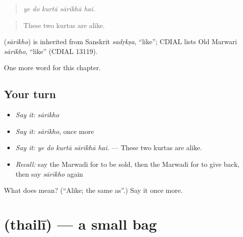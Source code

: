 \begin{quote}
    
\end{quote}

\begin{quote}
\emph{ye do kurtā sārīkhā hai.}
\end{quote}

\begin{quote}
These two kurtas are alike.
\end{quote}

\begin{cousinweb}
\textbf{} (\emph{sārīkho}) is inherited from Sanskrit \emph{sadṛkṣa}, \textquotedblleft{}like\textquotedblright{}; CDIAL lists Old Marwari \emph{sārikho}, \textquotedblleft{}like\textquotedblright{} (CDIAL 13119).
\end{cousinweb}

\begin{grammarlens}[title={What you've built}]
One more word for this chapter.
\end{grammarlens}

\subsection*{Your turn}
\begin{itemize}
\raggedright
  \item \emph{Say it:} \emph{sārīkho}
  \item \emph{Say it:} \emph{sārīkho}, once more
  \item \emph{Say it:} \emph{ye do kurtā sārīkhā hai.} — These two kurtas are alike.
  \item \emph{Recall:} say the Marwadi for to be sold, then the Marwadi for to give back, then say \emph{sārīkho} again
\end{itemize}

\begin{tcolorbox}[breakable,colback=teal!4,colframe=teal!35!black,title={Before you move on}]
What does  mean? (\textquotedblleft{}Alike; the same as\textquotedblright{}.) Say it once more.
\end{tcolorbox}
\section[\texorpdfstring{\mw{थैली} (thailī)}{थैली (thailī)}]{ (thailī) — a small bag}

\label{lesson:MW-C214-thaili}



